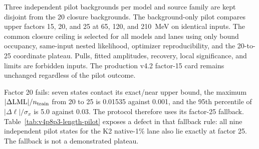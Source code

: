 Three independent pilot backgrounds per model and source family are kept
disjoint from the 20 closure backgrounds.  The background-only pilot compares
upper factors 15, 20, and 25 at 65, 120, and 210~MeV on identical inputs.  The
common closure ceiling is selected for all models and lanes using only bound
occupancy, same-input nested likelihood, optimizer reproducibility, and the
20-to-25 coordinate plateau.  Pulls, fitted amplitudes, recovery, local
significance, and limits are forbidden inputs.  The production v4.2 factor-15
card remains unchanged regardless of the pilot outcome.

Factor 20 fails: seven states contact its exact/near upper bound, the maximum
$\lvert\Delta\mathrm{LML}\rvert/n_{\rm train}$ from 20 to 25 is 0.01535
against 0.001, and the 95th percentile of
$\lvert\Delta\ell\rvert/\sigma_x$ is 5.0 against 0.03.  The protocol therefore
uses its factor-25 fallback.  Table~\ref{tab:v4p8p3-length-pilot} exposes a
defect in that fallback rule: all nine independent pilot states for the K2 native-1\%
lane also lie exactly at factor 25.  The fallback is not a demonstrated
plateau.

\begin{table}[htbp]
\centering
\caption{Pull-blind length-ceiling pilot.  Each contact column contains nine
states (three pilot backgrounds at three masses).  ``Closure F25'' is the
number of upper contacts among the 400 accepted extraction states in that
lane; it is shown only as a post-collection diagnostic and was not used to
select the fallback.}
\label{tab:v4p8p3-length-pilot}
\end{table}

